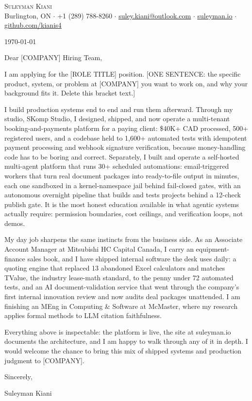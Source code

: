 \documentclass[letterpaper,11pt]{article}
\newcommand{\company}{[COMPANY]}
\newcommand{\role}{[ROLE TITLE]}
\newcommand{\hook}{[ONE SENTENCE: the specific product, system, or problem at \company{} you want to work on, and why your background fits it. Delete this bracket text.]}
\begin{document}
\begin{center}
    {\Huge \scshape Suleyman Kiani} \\ \vspace{3pt}
    \small Burlington, ON $\cdot$ +1 (289) 788-8260 $\cdot$ \href{mailto:suley.kiani@outlook.com}{\underline{suley.kiani@outlook.com}} $\cdot$ \href{https://suleyman.io}{\underline{suleyman.io}} $\cdot$ \href{https://github.com/kianis4}{\underline{github.com/kianis4}}
\end{center}

\vspace{8pt}
\today

Dear \company{} Hiring Team,

I am applying for the \role{} position. \hook{}

I build production systems end to end and run them afterward. Through my studio, SKomp Studio, I designed, shipped, and now operate a multi-tenant booking-and-payments platform for a paying client: \$40K+ CAD processed, 500+ registered users, and a codebase held to 1,600+ automated tests with idempotent payment processing and webhook signature verification, because money-handling code has to be boring and correct. Separately, I built and operate a self-hosted multi-agent platform that runs 30+ scheduled automations: email-triggered workers that turn real document packages into ready-to-file output in minutes, each one sandboxed in a kernel-namespace jail behind fail-closed gates, with an autonomous overnight pipeline that builds and tests projects behind a 12-check publish gate. It is the most honest education available in what agentic systems actually require: permission boundaries, cost ceilings, and verification loops, not demos.

My day job sharpens the same instincts from the business side. As an Associate Account Manager at Mitsubishi HC Capital Canada, I carry an equipment-finance sales book, and I have shipped internal software the desk uses daily: a quoting engine that replaced 13 abandoned Excel calculators and matches TValue, the industry lease-math standard, to the penny under 72 automated tests, and an AI document-validation service that went through the company's first internal innovation review and now audits deal packages unattended. I am finishing an MEng in Computing \& Software at McMaster, where my research applies formal methods to LLM citation faithfulness.

Everything above is inspectable: the platform is live, the site at suleyman.io documents the architecture, and I am happy to walk through any of it in depth. I would welcome the chance to bring this mix of shipped systems and production judgment to \company{}.

Sincerely,

Suleyman Kiani
\end{document}
